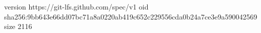 version https://git-lfs.github.com/spec/v1
oid sha256:9bb643e66dd07bc71a8a0220ab419c652c229556cda0b24a7ce3e9a590042569
size 2116
